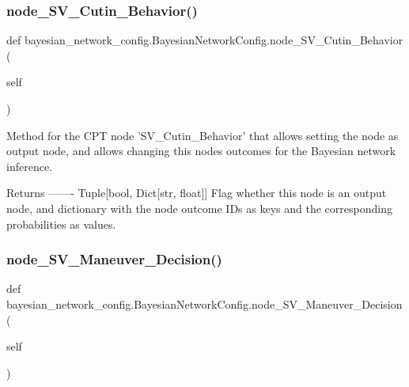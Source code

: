 \subsubsection{\texorpdfstring{node\+\_\+\+S\+V\+\_\+\+Cutin\+\_\+\+Behavior()}{node\_SV\_Cutin\_Behavior()}\hspace{0.1cm}{\footnotesize\ttfamily [2/2]}}
{\footnotesize\ttfamily def bayesian\+\_\+network\+\_\+config.\+Bayesian\+Network\+Config.\+node\+\_\+\+S\+V\+\_\+\+Cutin\+\_\+\+Behavior (\begin{DoxyParamCaption}\item[{}]{self }\end{DoxyParamCaption})}

\begin{DoxyVerb}Method for the CPT node 'SV_Cutin_Behavior' that allows setting the node as output node, 
and allows changing this nodes outcomes for the Bayesian network inference.

Returns
-------
Tuple[bool, Dict[str, float]]
    Flag whether this node is an output node, and dictionary with the node outcome IDs as keys 
    and the corresponding probabilities as values.
\end{DoxyVerb}
 \mbox{\label{classbayesian__network__config_1_1_bayesian_network_config_a978dd92b9826d22d6e521630d0a34379}} 
\subsubsection{\texorpdfstring{node\+\_\+\+S\+V\+\_\+\+Maneuver\+\_\+\+Decision()}{node\_SV\_Maneuver\_Decision()}\hspace{0.1cm}{\footnotesize\ttfamily [1/2]}}
{\footnotesize\ttfamily def bayesian\+\_\+network\+\_\+config.\+Bayesian\+Network\+Config.\+node\+\_\+\+S\+V\+\_\+\+Maneuver\+\_\+\+Decision (\begin{DoxyParamCaption}\item[{}]{self }\end{DoxyParamCaption})}

